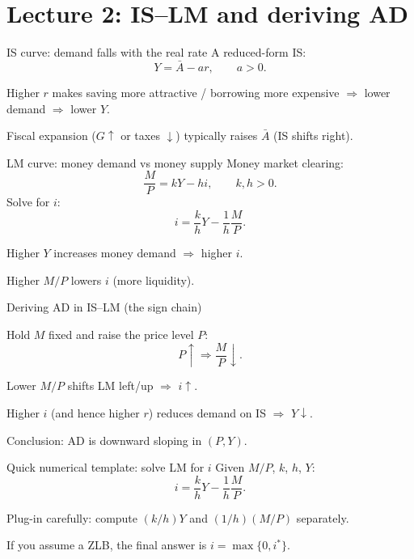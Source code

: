 \documentclass[aspectratio=169,xcolor=dvipsnames]{beamer}
\let\tempone\itemize
\let\temptwo\enditemize
\renewenvironment{itemize}{\tempone\addtolength{\itemsep}{\fill}}{\temptwo}
\begin{document}
\section[Lecture 2]{Lecture 2: IS--LM and deriving AD}

\begin{frame}{IS curve: demand falls with the real rate}
A reduced-form IS:
\[
Y=\bar A-a r,\qquad a>0.
\]
\begin{itemize}
\item Higher $r$ makes saving more attractive / borrowing more expensive $\Rightarrow$ lower demand $\Rightarrow$ lower $Y$.
\item Fiscal expansion ($G\uparrow$ or taxes $\downarrow$) typically raises $\bar A$ (IS shifts right).
\end{itemize}
\end{frame}

\begin{frame}{LM curve: money demand vs money supply}
Money market clearing:
\[
\frac{M}{P}=kY-h i,\qquad k,h>0.
\]
Solve for $i$:
\[
i=\frac{k}{h}Y-\frac{1}{h}\frac{M}{P}.
\]

\begin{itemize}
\item Higher $Y$ increases money demand $\Rightarrow$ higher $i$.
\item Higher $M/P$ lowers $i$ (more liquidity).
\end{itemize}
\end{frame}

\begin{frame}{Deriving AD in IS--LM (the sign chain)}
\begin{itemize}
\item Hold $M$ fixed and raise the price level $P$:
\[
P\uparrow \Rightarrow \frac{M}{P}\downarrow.
\]
\item Lower $M/P$ shifts LM left/up $\Rightarrow$ $i\uparrow$.
\item Higher $i$ (and hence higher $r$) reduces demand on IS $\Rightarrow$ $Y\downarrow$.
\end{itemize}

\begin{itemize}
\item Conclusion: AD is downward sloping in $(P,Y)$.
\end{itemize}
\end{frame}

\begin{frame}{Quick numerical template: solve LM for $i$}
Given $M/P$, $k$, $h$, $Y$:
\[
i=\frac{k}{h}Y-\frac{1}{h}\frac{M}{P}.
\]
\begin{itemize}
\item Plug-in carefully: compute $(k/h)Y$ and $(1/h)(M/P)$ separately.
\item If you assume a ZLB, the final answer is $i=\max\{0,i^\ast\}$.
\end{itemize}
\end{frame}
\end{document}
